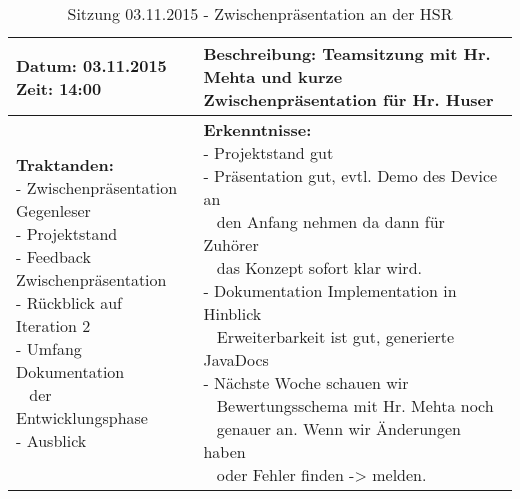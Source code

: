 \begin{table}[H]
\begin{tabularx}{\textwidth}{| l | X |}
\hline
\textbf{Datum:} 03.11.2015
\textbf{Zeit:} 14:00
&
\textbf{Beschreibung:} Teamsitzung mit Hr. Mehta und kurze Zwischenpräsentation für Hr. Huser\\ \hline
\specialcell[t]{
\textbf{Traktanden:}\\
- Zwischenpräsentation Gegenleser\\
- Projektstand\\
- Feedback Zwischenpräsentation\\
- Rückblick auf Iteration 2\\
- Umfang Dokumentation\\~ der Entwicklungsphase\\
- Ausblick\\
}
& 
\specialcell[t]{
\textbf{Erkenntnisse:}\\
- Projektstand gut\\
- Präsentation gut, evtl. Demo des Device an\\~ den Anfang nehmen da dann für Zuhörer\\~ das Konzept sofort klar wird.\\
- Dokumentation Implementation in Hinblick\\~ Erweiterbarkeit ist gut, generierte JavaDocs\\
- Nächste Woche schauen wir\\~ Bewertungsschema mit Hr. Mehta noch\\~ genauer an. Wenn wir Änderungen haben\\~ oder Fehler finden -> melden.\\
}
\\ \hline
\end{tabularx}
\caption{Sitzung 03.11.2015 - Zwischenpräsentation an der HSR}
\end{table}



